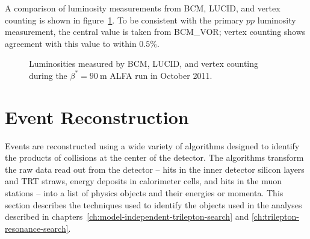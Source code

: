 A comparison of luminosity measurements from BCM, LUCID, and vertex counting is shown in figure~\ref{fig:reco-luminosity-alfa}. To be consistent with the primary $pp$ luminosity measurement, the central value is taken from BCM\_VOR; vertex counting shows agreement with this value to within $0.5\%$.

\begin{figure}[h]
	\centering
	\caption{Luminosities measured by BCM, LUCID, and vertex counting during the $\beta^{*}=90~\mbox{m}$ ALFA run in October 2011.}
	\label{fig:reco-luminosity-alfa}
\end{figure}

\clearpage

\section{Event Reconstruction}\label{sec:event-reconstruction}
Events are reconstructed using a wide variety of algorithms designed to identify the products of collisions at the center of the detector. The algorithms transform the raw data read out from the detector -- hits in the inner detector silicon layers and TRT straws, energy deposits in calorimeter cells, and hits in the muon stations -- into a list of physics objects and their energies or momenta. This section describes the techniques used to identify the objects used in the analyses described in chapters~\ref{ch:model-independent-trilepton-search} and \ref{ch:trilepton-resonance-search}. 



